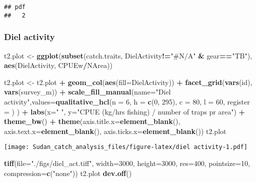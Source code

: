 \documentclass[]{article}
\newenvironment{Shaded}{\begin{snugshade}}{\end{snugshade}}
\newcommand{\KeywordTok}[1]{\textcolor[rgb]{0.13,0.29,0.53}{\textbf{#1}}}
\newcommand{\DataTypeTok}[1]{\textcolor[rgb]{0.13,0.29,0.53}{#1}}
\newcommand{\DecValTok}[1]{\textcolor[rgb]{0.00,0.00,0.81}{#1}}
\newcommand{\StringTok}[1]{\textcolor[rgb]{0.31,0.60,0.02}{#1}}
\newcommand{\OperatorTok}[1]{\textcolor[rgb]{0.81,0.36,0.00}{\textbf{#1}}}
\newcommand{\NormalTok}[1]{#1}
\begin{document}
\begin{verbatim}
## pdf 
##   2
\end{verbatim}

\subsubsection{Diel activity}\label{diel-activity}

\begin{Shaded}
\begin{Highlighting}[]
\NormalTok{t2.plot <-}\StringTok{ }\KeywordTok{ggplot}\NormalTok{(}\KeywordTok{subset}\NormalTok{(catch.traits, DielActivity}\OperatorTok{!=}\StringTok{"#N/A"} \OperatorTok{&}\StringTok{ }\NormalTok{gear}\OperatorTok{==}\StringTok{"TB"}\NormalTok{), }\KeywordTok{aes}\NormalTok{(DielActivity, CPUEw}\OperatorTok{/}\NormalTok{NArea))}

\NormalTok{t2.plot <-}\StringTok{ }\NormalTok{t2.plot }\OperatorTok{+}\StringTok{ }\KeywordTok{geom_col}\NormalTok{(}\KeywordTok{aes}\NormalTok{(}\DataTypeTok{fill=}\NormalTok{DielActivity)) }\OperatorTok{+}\StringTok{ }\KeywordTok{facet_grid}\NormalTok{(}\KeywordTok{vars}\NormalTok{(id), }\KeywordTok{vars}\NormalTok{(survey_m)) }\OperatorTok{+}\StringTok{ }\KeywordTok{scale_fill_manual}\NormalTok{(}\DataTypeTok{name=}\StringTok{"Diel activity"}\NormalTok{,}\DataTypeTok{values=}\KeywordTok{qualitative_hcl}\NormalTok{(}\DataTypeTok{n =} \DecValTok{6}\NormalTok{, }\DataTypeTok{h =} \KeywordTok{c}\NormalTok{(}\DecValTok{0}\NormalTok{, }\DecValTok{295}\NormalTok{), }\DataTypeTok{c =} \DecValTok{80}\NormalTok{, }\DataTypeTok{l =} \DecValTok{60}\NormalTok{, }\DataTypeTok{register =}\NormalTok{ ) ) }\OperatorTok{+}\StringTok{ }\KeywordTok{labs}\NormalTok{(}\DataTypeTok{x=}\StringTok{" "}\NormalTok{, }\DataTypeTok{y=}\StringTok{"CPUE (kg/hrs fishing) / number of traps pr area"}\NormalTok{) }\OperatorTok{+}\StringTok{ }\KeywordTok{theme_bw}\NormalTok{() }\OperatorTok{+}\StringTok{ }
\StringTok{  }\KeywordTok{theme}\NormalTok{(}\DataTypeTok{axis.title.x=}\KeywordTok{element_blank}\NormalTok{(), }\DataTypeTok{axis.text.x=}\KeywordTok{element_blank}\NormalTok{(), }\DataTypeTok{axis.ticks.x=}\KeywordTok{element_blank}\NormalTok{())}
\NormalTok{t2.plot}
\end{Highlighting}
\end{Shaded}

\texttt{[image: Sudan\_catch\_analysis\_files/figure-latex/diel activity-1.pdf]}

\begin{Shaded}
\begin{Highlighting}[]
\KeywordTok{tiff}\NormalTok{(}\DataTypeTok{file=}\StringTok{"./figs/diel_act.tiff"}\NormalTok{, }\DataTypeTok{width=}\DecValTok{3000}\NormalTok{, }\DataTypeTok{height=}\DecValTok{3000}\NormalTok{, }\DataTypeTok{res=}\DecValTok{400}\NormalTok{, }\DataTypeTok{pointsize=}\DecValTok{10}\NormalTok{, }\DataTypeTok{compression=}\KeywordTok{c}\NormalTok{(}\StringTok{"none"}\NormalTok{))}
\NormalTok{t2.plot}
\KeywordTok{dev.off}\NormalTok{()}
\end{Highlighting}
\end{Shaded}
\end{document}
